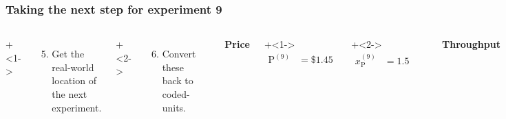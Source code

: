 \begin{frame}\frametitle{Taking the next step for experiment 9}
	\begin{columns}[T]

			\vspace{1cm}
			\onslide+<1->{
				{\tiny 
					\begin{enumerate}\setcounter{enumi}{4}
						\item	Get the real-world location
						of the next experiment.
					\end{enumerate}
				
				\par}
			}
			
			\onslide+<2->{
				{\tiny 
					\begin{enumerate}\setcounter{enumi}{5}
						\item	Convert these back to coded-units.
					\end{enumerate}
				
				\par}
			}
			
				
			\rule[3mm]{0.01cm}{25mm}%
			
			
			\centerline{\textbf{Price}}
			
	
			\onslide+<1->{
				\begin{align*} 
					\text{P}^{(9)} &= \$1.45
				\end{align*}
			}
			
			\vspace{-1.1cm}
			\onslide+<2->{
				\begin{align*} 
					x_\text{P}^{(9)} &= 1.5
				\end{align*}
			}
		
			\rule[3mm]{0.01cm}{30mm}%
			
			\centerline{\textbf{Throughput}}
			
			\onslide+<1->{
				\begin{align*} 
					\text{T}^{(9)} &= 337 ~\text{parts per hour}
				\end{align*}
			}
			
			\vspace{-1.1cm}
			\onslide+<2->{	
				\begin{align*} 
					x_\text{T}^{(9)} &= \dfrac{337 - 334}{\tfrac{1}{2}(8)} = 0.75~(\text{not $0.718$})
				\end{align*}
			}
	\end{columns}


\end{frame}
